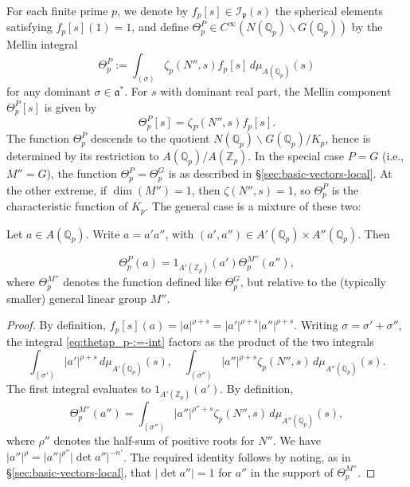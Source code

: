 For each finite prime $p$, we denote by $f_p[s] \in \mathcal{I}_\mathfrak{p}(s)$ the spherical elements satisfying $f_p[s](1) = 1$, and define $\Theta^P_p \in C^\infty(N(\mathbb{Q}_p) \backslash G(\mathbb{Q}_p))$ by the Mellin integral 
\begin{equation}\label{eq:thetap_p-:=-int}
  \Theta^P_p :=
  \int_{(\sigma)}
  \zeta_p(N'', s) f_p[s]
  \, d \mu_{A(\mathbb{Q}_p)}(s)
\end{equation}
for any dominant $\sigma \in \mathfrak{a}^*$.  For $s$ with dominant real part, the Mellin component $\Theta_p^P[s]$ is given by
\begin{equation*}
  \Theta_p^P[s] = \zeta_P(N'',s) f_p[s].
\end{equation*}
The function $\Theta_p^P$ descends to the quotient $N(\mathbb{Q}_p) \backslash G(\mathbb{Q}_p) / K_p$, hence is determined by its restriction to $A(\mathbb{Q}_p)/A(\mathbb{Z}_p)$.  In the special case $P = G$ (i.e., $M'' = G$), the function $\Theta_p^P = \Theta_p^G$ is as described in \S\ref{sec:basic-vectors-local}.  At the other extreme, if $\dim(M'') = 1$, then $\zeta(N'',s) = 1$, so $\Theta^P_p$ is the characteristic function of $K_p$.  The general case is a mixture of these two:
\begin{lemma}\label{lem:Theta-P-p}
  Let $a \in A(\mathbb{Q}_p)$.  Write $a = a' a''$, with $(a',a'') \in A'(\mathbb{Q}_p) \times A''(\mathbb{Q}_p)$.  Then

  \begin{equation}\label{eq:thet-=-1_am}
    \Theta_p^P(a) = 1_{A'(\mathbb{Z}_p)}(a')
    \Theta^{M''}_p(a''),
  \end{equation}
  where $\Theta^{M''}_p$ denotes the function defined like $\Theta^G_p$, but relative to the (typically smaller) general linear group $M''$.
\end{lemma}
\begin{proof}
  By definition, $f_p[s](a) = |a|^{\rho + s} = |a'|^{\rho + s} |a''|^{\rho + s}$.  Writing $\sigma = \sigma' + \sigma''$, the integral \eqref{eq:thetap_p-:=-int} factors as the product of the two integrals
  \begin{equation*}
    \int_{(\sigma')}
    |a'|^{\rho + s}
    \, d \mu_{A'(\mathbb{Q}_p)}(s),
    \quad
    \int_{(\sigma'')}
    |a''|^{\rho + s}
    \zeta_p(N'',s) \, d \mu_{A''(\mathbb{Q}_p)}(s).
  \end{equation*}
  The first integral evaluates to $1_{A'(\mathbb{Z}_p)}(a')$.  By definition,
  \begin{equation*}
    \Theta_p^{M''}(a'') = \int_{(\sigma'')} |a''|^{\rho'' + s} \zeta_p(N'',s) \, d \mu_{A''(\mathbb{Q}_p)}(s),
  \end{equation*}
  where $\rho''$ denotes the half-sum of positive roots for $N''$.  We have $|a''|^{\rho} = |a''|^{\rho''} |\det a''|^{-n'}$.  The required identity follows by noting, as in \S\ref{sec:basic-vectors-local}, that $|\det a''| = 1$ for $a''$ in the support of $\Theta_p^{M''}$.
\end{proof}


